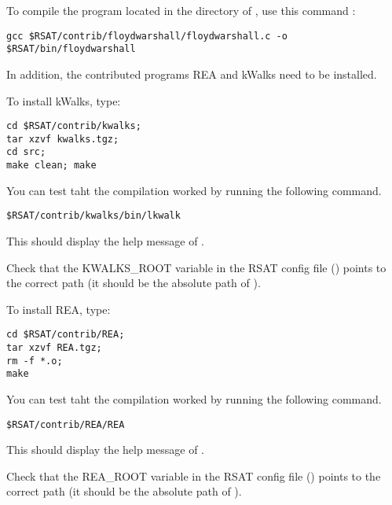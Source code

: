 \documentclass[12pt,a4paper, oneside]{scrreprt} %
\begin{document}
To compile the program  located in the
 directory of \RSAT, use this command :

\begin{lstlisting}
gcc $RSAT/contrib/floydwarshall/floydwarshall.c -o $RSAT/bin/floydwarshall
\end{lstlisting}


In addition, the contributed programs REA and kWalks need to be installed.

To install kWalks, type:


\begin{lstlisting}
cd $RSAT/contrib/kwalks; 
tar xzvf kwalks.tgz; 
cd src; 
make clean; make
\end{lstlisting}

You can test taht the compilation worked by running the following
command.

\begin{lstlisting}
$RSAT/contrib/kwalks/bin/lkwalk
\end{lstlisting}

This should display the help message of .

Check that the KWALKS\_ROOT variable in the RSAT config file
() points to the correct path (it
should be the absolute path of ).

To install REA, type:

\begin{lstlisting}
cd $RSAT/contrib/REA; 
tar xzvf REA.tgz; 
rm -f *.o; 
make
\end{lstlisting}

You can test taht the compilation worked by running the following
command.

\begin{lstlisting}
$RSAT/contrib/REA/REA
\end{lstlisting}

This should display the help message of .

Check that the REA\_ROOT variable in the RSAT config file
() points to the correct path (it
should be the absolute path of ).






\end{document}
